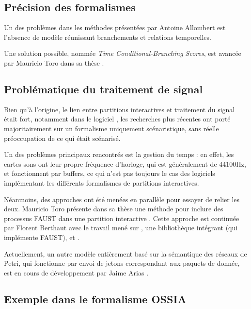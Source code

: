 \subsection{Précision des formalismes}
Un des problèmes dans les méthodes présentées par Antoine Allombert est l'absence de modèle réunissant branchements et relations temporelles.

Une solution possible, nommée \textit{Time Conditional-Branching Scores}, est avancée par Mauricio Toro dans sa thèse \cite{mauricio2012structured}.

\subsection{Problématique du traitement de signal}
Bien qu'à l'origine, le lien entre partitions interactives et traitement du signal était fort, notamment dans le logiciel , les recherches plus récentes ont porté majoritairement sur un formalisme uniquement scénaristique, sans réelle préoccupation de ce qui était scénarisé.

Un des problèmes principaux rencontrés est la gestion du temps : en effet, les cartes sons ont leur propre fréquence d'horloge, qui est généralement de $\num{44100}\si{\hertz}$, et fonctionnent par buffers, ce qui n'est pas toujours le cas des logiciels implémentant les différents formalismes de partitions interactives.

Néanmoins, des approches ont été menées en parallèle pour essayer de relier les deux. Mauricio Toro présente dans sa thèse une méthode pour inclure des processus \ac{FAUST} dans une partition interactive \cite[chapitre 8]{mauricio2012structured}.
Cette approche est continuée par Florent Berthaut avec le travail mené sur , une bibliothèque intégrant  (qui implémente \ac{FAUST}), et  \cite{desaintecatherine2014interactive}.

Actuellement, un autre modèle entièrement basé sur la sémantique des réseaux de Petri, qui fonctionne par envoi de jetons correspondant aux paquets de donnée, est en cours de développement par Jaime Arias \cite{arias2014modelling}.

\subsection{Exemple dans le formalisme OSSIA}

